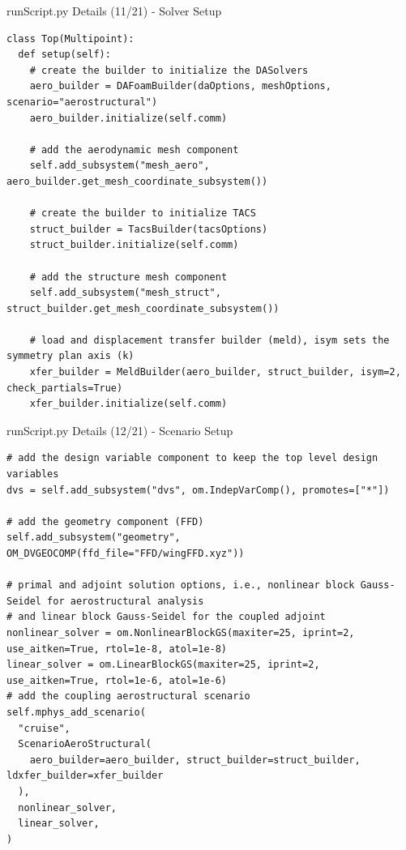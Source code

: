 \documentclass{bredelebeamer}
\begin{document}
\begin{frame}[fragile]{runScript.py Details (11/21) - \large Solver Setup}
\scriptsize
\lstset{ language=bash }
\begin{lstlisting}
class Top(Multipoint):
  def setup(self):
    # create the builder to initialize the DASolvers
    aero_builder = DAFoamBuilder(daOptions, meshOptions, scenario="aerostructural")
    aero_builder.initialize(self.comm)

    # add the aerodynamic mesh component
    self.add_subsystem("mesh_aero", aero_builder.get_mesh_coordinate_subsystem())

    # create the builder to initialize TACS
    struct_builder = TacsBuilder(tacsOptions)
    struct_builder.initialize(self.comm)

    # add the structure mesh component
    self.add_subsystem("mesh_struct", struct_builder.get_mesh_coordinate_subsystem())

    # load and displacement transfer builder (meld), isym sets the symmetry plan axis (k)
    xfer_builder = MeldBuilder(aero_builder, struct_builder, isym=2, check_partials=True)
    xfer_builder.initialize(self.comm)
\end{lstlisting}
\normalsize
\end{frame}

\begin{frame}[fragile]{runScript.py Details (12/21) - \large Scenario Setup}
\scriptsize
\lstset{ language=bash }
\begin{lstlisting}
# add the design variable component to keep the top level design variables
dvs = self.add_subsystem("dvs", om.IndepVarComp(), promotes=["*"])

# add the geometry component (FFD)
self.add_subsystem("geometry", OM_DVGEOCOMP(ffd_file="FFD/wingFFD.xyz"))

# primal and adjoint solution options, i.e., nonlinear block Gauss-Seidel for aerostructural analysis
# and linear block Gauss-Seidel for the coupled adjoint
nonlinear_solver = om.NonlinearBlockGS(maxiter=25, iprint=2, use_aitken=True, rtol=1e-8, atol=1e-8)
linear_solver = om.LinearBlockGS(maxiter=25, iprint=2, use_aitken=True, rtol=1e-6, atol=1e-6)
# add the coupling aerostructural scenario
self.mphys_add_scenario(
  "cruise",
  ScenarioAeroStructural(
    aero_builder=aero_builder, struct_builder=struct_builder, ldxfer_builder=xfer_builder
  ),
  nonlinear_solver,
  linear_solver,
)
\end{lstlisting}
\normalsize
\end{frame}
\end{document}
